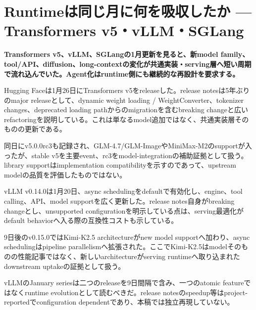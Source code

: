 \section{Runtimeは同じ月に何を吸収したか — Transformers v5・vLLM・SGLang}
\label{pkg:runtime-catches-the-agent-wave}
\noindent\textbf{Transformers v5、vLLM、SGLangの1月更新を見ると、新model family、tool/API、diffusion、long-contextの変化が共通実装・serving層へ短い周期で流れ込んでいた。Agent化はruntime側にも継続的な再設計を要求する。}\autocite{src-152188dd686e,src-3bc80a3c7870,src-6a97353d35a9}

Hugging Faceは1月26日にTransformers v5をreleaseした。release notesは5年ぶりのmajor releaseとして、dynamic weight loading / WeightConverter、tokenizer changes、deprecated loading pathからのmigrationを含むbreaking changeと広いrefactoringを説明している。これは単なるmodel追加ではなく、共通実装層そのものの更新である。\autocite{src-152188dd686e}


\begin{claimboundary}
同日にv5.0.0rc3も記録され、GLM-4.7/GLM-ImageやMiniMax-M2のsupportが入ったが、stable v5を主要event、rc3をmodel-integrationの補助証拠として扱う。library supportはimplementation compatibilityを示すのであって、upstream modelの品質を評価したものではない。\autocite{src-152188dd686e,src-9f7ae4228266}
\end{claimboundary}

vLLM v0.14.0は1月20日、async schedulingをdefaultで有効化し、engine、tool calling、API、model supportを広く更新した。release notes自身がbreaking changeとし、unsupported configurationを明示している点は、serving最適化がdefault behaviorへ入る際の互換性コストも示している。\autocite{src-3bc80a3c7870}


9日後のv0.15.0ではKimi-K2.5 architectureがnew model supportへ加わり、async schedulingはpipeline parallelismへ拡張された。ここでKimi-K2.5はmodelそのものの性能記事ではなく、新しいarchitectureがserving runtimeへ取り込まれたdownstream uptakeの証拠として扱う。\autocite{src-d9f9de620203}


\begin{claimboundary}
vLLMのJanuary seriesは二つのreleaseを9日間隔で含み、一つのatomic featureではなくruntime evolutionとして読むべきだ。release notesのspeedup等はproject-reportedでconfiguration dependentであり、本稿では独立再現していない。\autocite{src-3bc80a3c7870,src-d9f9de620203}
\end{claimboundary}


